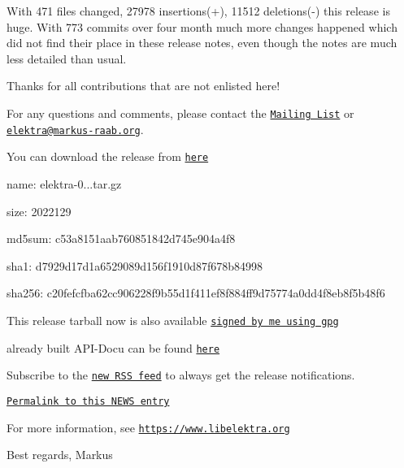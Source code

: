 With 471 files changed, 27978 insertions(+), 11512 deletions(-\/) this release is huge. With 773 commits over four month much more changes happened which did not find their place in these release notes, even though the notes are much less detailed than usual.

Thanks for all contributions that are not enlisted here!

For any questions and comments, please contact the \href{https://lists.sourceforge.net/lists/listinfo/registry-list}{\tt Mailing List} or \href{mailto:elektra@markus-raab.org}{\tt elektra@markus-\/raab.\+org}.

You can download the release from \href{http://www.markus-raab.org/ftp/elektra/releases/elektra-0.8.11.tar.gz}{\tt here}


\begin{DoxyItemize}
\item name\+: elektra-\/0...\+tar.\+gz
\item size\+: 2022129
\item md5sum\+: c53a8151aab760851842d745e904a4f8
\item sha1\+: d7929d17d1a6529089d156f1910d87f678b84998
\item sha256\+: c20fefcfba62cc906228f9b55d1f411ef8f884ff9d75774a0dd4f8eb8f5b48f6
\end{DoxyItemize}

This release tarball now is also available \href{http://www.markus-raab.org/ftp/elektra/releases/elektra-0.8.11.tar.gz.gpg}{\tt signed by me using gpg}

already built A\+P\+I-\/\+Docu can be found \href{https://doc.libelektra.org/api/0.8.11/html/}{\tt here}

Subscribe to the \href{https://doc.libelektra.org/news/feed.rss}{\tt new R\+SS feed} to always get the release notifications.

\href{https://doc.libelektra.org/news/7d4647d4-4131-411e-9c2a-2aca39446e18.html}{\tt Permalink to this N\+E\+WS entry}

For more information, see \href{https://www.libelektra.org}{\tt https\+://www.\+libelektra.\+org}

Best regards, Markus 